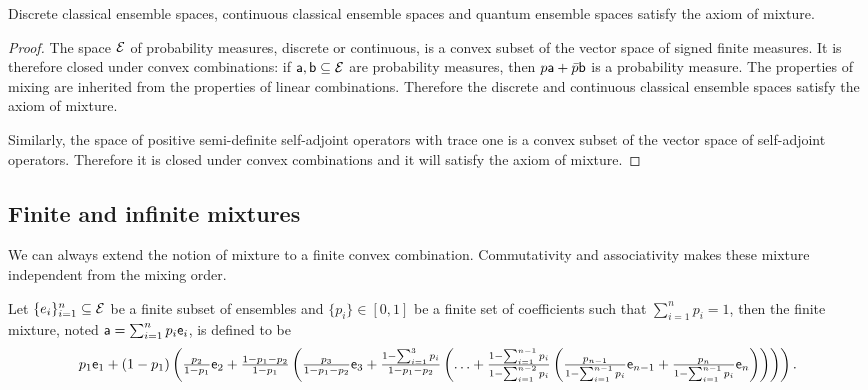 \begin{mathSection}
\begin{prop}
	Discrete classical ensemble spaces, continuous classical ensemble spaces and quantum ensemble spaces satisfy the axiom of mixture.
\end{prop}

\begin{proof}
	The space $\Ens$ of probability measures, discrete or continuous, is a convex subset of the vector space of signed finite measures. It is therefore closed under convex combinations: if $\ens[a], \ens[b] \subseteq \Ens$ are probability measures, then $p \ens[a] + \bar{p} \ens[b]$ is a probability measure. The properties of mixing are inherited from the properties of linear combinations. Therefore the discrete and continuous classical ensemble spaces satisfy the axiom of mixture.
	
	Similarly, the space of positive semi-definite self-adjoint operators with trace one is a convex subset of the vector space of self-adjoint operators. Therefore it is closed under convex combinations and it will satisfy the axiom of mixture.
\end{proof}
\end{mathSection}

\subsection{Finite and infinite mixtures}

We can always extend the notion of mixture to a finite convex combination. Commutativity and associativity makes these mixture independent from the mixing order.

\begin{defn}
	Let $\{e_i\}_{i=1}^{n} \subseteq \Ens$ be a finite subset of ensembles and $\{p_i\} \in [0,1]$ be a finite set of coefficients such that $\sum_{i=1}^{n} p_i = 1$, then the finite mixture, noted $\ens[a] = \sum_{i=1}^{n} p_i \ens_i$, is defined to be
	$$p_1 \ens_1 + (1-p_1)\left( \tfrac{p_2}{1-p_1} \ens_2 + \tfrac{1-p_1-p_2}{1-p_1} \left( \tfrac{p_3}{1-p_1-p_2} \ens_3 +  \tfrac{1-\sum_{i=1}^{3}p_i}{1-p_1-p_2}\left(\ldots+\tfrac{1-\sum_{i=1}^{n-1}p_i}{1-\sum_{i=1}^{n-2}p_i}\left(\tfrac{p_{n-1}}{1- \sum_{i=1}^{n-1}p_i} \ens_{n-1} + \tfrac{p_n}{1- \sum_{i=1}^{n-1}p_i}\ens_n\right)\right) \right) \right).$$
\end{defn}


